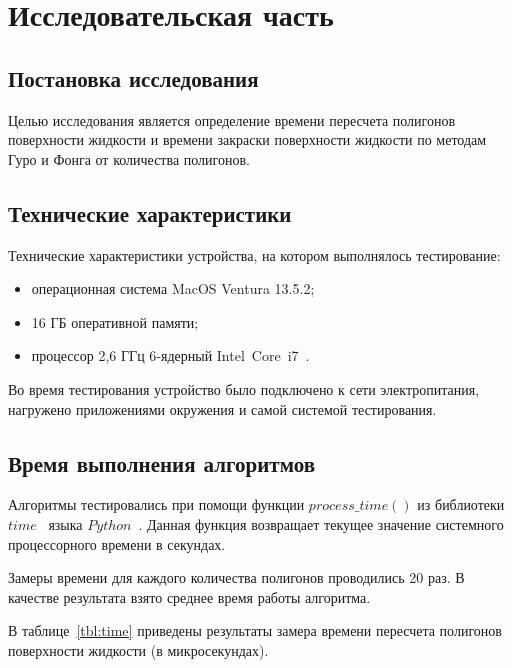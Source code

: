 \chapter{Исследовательская часть}

\section{Постановка исследования}

Целью исследования является определение времени пересчета полигонов поверхности жидкости и времени закраски поверхности жидкости по методам Гуро и Фонга от количества полигонов.



\section{Технические характеристики}

Технические характеристики устройства, на котором выполнялось тестирование:
\begin{itemize}[label={---}]
	\item операционная система MacOS Ventura 13.5.2;
	\item 16 ГБ оперативной памяти;
    \item процессор 2,6 ГГц 6‑ядерный Intel Core i7~\cite{intel}.

\end{itemize}

Во время тестирования устройство было подключено к сети электропитания, нагружено приложениями окружения и самой системой тестирования.

\section{Время выполнения алгоритмов}

Алгоритмы тестировались при помощи функции $process\_time()$ из библиотеки $time$~\cite{pythonlangtime} языка $Python$~\cite{python}. 
Данная функция возвращает текущее значение системного процессорного времени в секундах.

Замеры времени для каждого количества полигонов проводились 20 раз. 
В качестве результата взято среднее время работы алгоритма. 

В таблице~\ref{tbl:time} приведены результаты замера времени пересчета полигонов поверхности жидкости (в микросекундах). 


